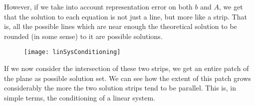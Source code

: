 However, if we take into account representation error on both $b$ and $A$, we get that the solution to each equation is not just a line, but more like a strip. That is, all the possible lines which are near enough the theoretical solution to be rounded (in some sense) to it are possible solutions.
\begin{figure}[H]
	\texttt{[image: linSysConditioning]}
\end{figure}
If we now consider the intersection of these two strips, we get an entire patch of the plane as possible solution set. We can see how the extent of this patch grows considerably the more the two solution strips tend to be parallel. This is, in simple terms, the conditioning of a linear system.
